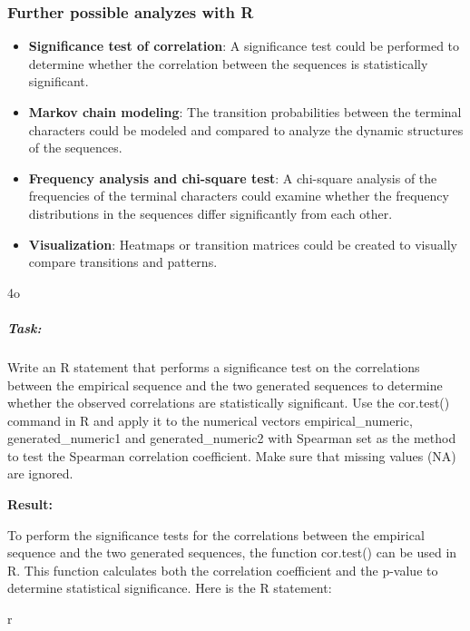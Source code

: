 \documentclass[
]{article}
\begin{document}
\subsubsection{\texorpdfstring{\textbf{Further possible analyzes with
R}}{Further possible analyzes with R}}\label{further-possible-analyzes-with-r}

\begin{itemize}
\item
  \textbf{Significance test of correlation}: A significance test could
  be performed to determine whether the correlation between the
  sequences is statistically significant.
\item
  \textbf{Markov chain modeling}: The transition probabilities between
  the terminal characters could be modeled and compared to analyze the
  dynamic structures of the sequences.
\item
  \textbf{Frequency analysis and chi-square test}: A chi-square analysis
  of the frequencies of the terminal characters could examine whether
  the frequency distributions in the sequences differ significantly from
  each other.
\item
  \textbf{Visualization}: Heatmaps or transition matrices could be
  created to visually compare transitions and patterns.
\end{itemize}

4o

\subparagraph{\texorpdfstring{ \textbf{Task:}}{ Task:}}\label{task-3}

Write an R statement that performs a significance test on the
correlations between the empirical sequence and the two generated
sequences to determine whether the observed correlations are
statistically significant. Use the cor.test() command in R and apply it
to the numerical vectors empirical\_numeric, generated\_numeric1 and
generated\_numeric2 with Spearman set as the method to test the Spearman
correlation coefficient. Make sure that missing values
\hspace{0pt}\hspace{0pt}(NA) are ignored.

\textbf{Result:}

To perform the significance tests for the correlations between the
empirical sequence and the two generated sequences, the function
cor.test() can be used in R. This function calculates both the
correlation coefficient and the p-value to determine statistical
significance. Here is the R statement:

r
\end{document}
